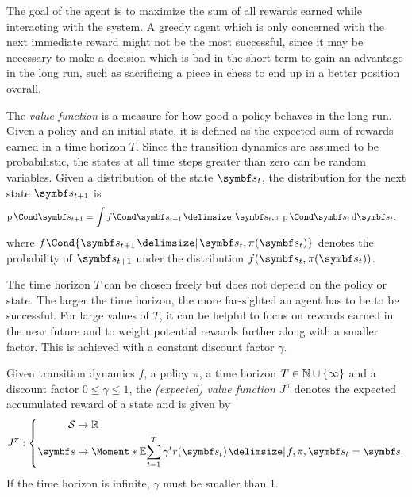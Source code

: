 The goal of the agent is to maximize the sum of all rewards earned while interacting with the system.
A greedy agent which is only concerned with the next immediate reward might not be the most successful, since it may be necessary to make a decision which is bad in the short term to gain an advantage in the long run, such as sacrificing a piece in chess to end up in a better position overall.

The \emph{value function} is a measure for how good a policy behaves in the long run.
Given a policy and an initial state, it is defined as the expected sum of rewards earned in a time horizon $T$.
Since the transition dynamics are assumed to be probabilistic, the states at all time steps greater than zero can be random variables.
Given a distribution of the state $\mat{s_t}$, the distribution for the next state $\mat{s_{t+1}}$ is
\begin{align}
    \Prob{\mat{s_{t+1}}} & = \int \Fun{f}{\mat{s_{t+1}} \given \mat{s_t}, \pi}\Prob{\mat{s_t}} \diff \mat{s_t},
\end{align}
where $f\Cond{\mat{s_{t+1}} \given \mat{s_t}, \pi(\mat{s_t})}$ denotes the probability of $\mat{s_{t+1}}$ under the distribution $f(\mat{s_t}, \pi(\mat{s_t}))$.

The time horizon $T$ can be chosen freely but does not depend on the policy or state.
The larger the time horizon, the more far-sighted an agent has to be to be successful.
For large values of $T$, it can be helpful to focus on rewards earned in the near future and to weight potential rewards further along with a smaller factor.
This is achieved with a constant discount factor $\gamma$.
\begin{definition}
    \label{def:reinforcement_learning:old_value_function}
    Given transition dynamics $f$, a policy $\pi$, a time horizon $T \in \mathbb{N} \cup \left\{ \infty \right\}$ and a discount factor $0 \leq \gamma \leq 1$, the \emph{(expected) value function $J^\pi$} denotes the expected accumulated reward of a state and is given by
    \begin{align}
        J^\pi : \left\{
        \begin{aligned}
            \Sc     & \to \Rb                                                                                      \\
            \mat{s} & \mapsto \Moment*{\E}{\sum_{t=1}^T \gamma^t r(\mat{s}_t) \given f, \pi, \mat{s}_t = \mat{s}}.
        \end{aligned}
        \right.
    \end{align}
    If the time horizon is infinite, $\gamma$ must be smaller than 1.
\end{definition}

